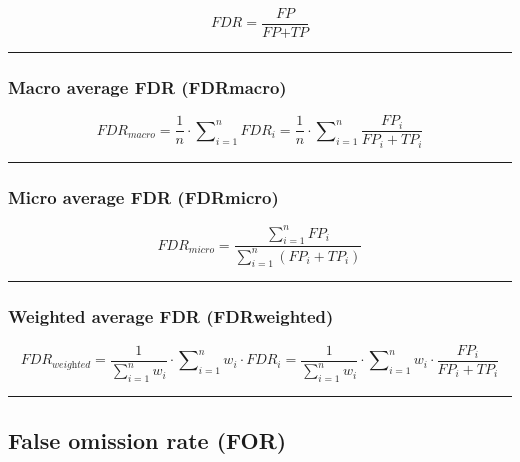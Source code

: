 \documentclass{article}
\begin{document}
\begin{equation}
	\textit{FDR} = \dfrac{\textit{FP}}{\textit{FP} + \textit{TP}}
%
	\label{equation:FDR}
\end{equation}

\hrule


\subsubsection{Macro average FDR (FDRmacro)}

\begin{equation}
	\textit{FDR}_\textit{macro} = \dfrac{1}{n} \cdot \sum\nolimits_{i = 1}^n \textit{FDR}_i = \dfrac{1}{n} \cdot \sum\nolimits_{i = 1}^n \dfrac{\textit{FP}_i}{\textit{FP}_i + \textit{TP}_i}
%
	\label{equation:MAAFDR}
\end{equation}

\hrule


\subsubsection{Micro average FDR (FDRmicro)}

\begin{equation}
	\textit{FDR}_\textit{micro} = \dfrac{\sum\nolimits_{i = 1}^n \textit{FP}_i}{\sum\nolimits_{i = 1}^n (\textit{FP}_i + \textit{TP}_i)}
%
	\label{equation:MIAFDR}
\end{equation}

\hrule


\subsubsection{Weighted average FDR (FDRweighted)}

\begin{equation}
	\textit{FDR}_\textit{weighted} = \dfrac{1}{\sum\nolimits_{i = 1}^n w_i} \cdot \sum\nolimits_{i = 1}^n w_i \cdot \textit{FDR}_i = \dfrac{1}{\sum\nolimits_{i = 1}^n w_i} \cdot \sum\nolimits_{i = 1}^n w_i \cdot \dfrac{\textit{FP}_i}{\textit{FP}_i + \textit{TP}_i}
%
	\label{equation:WAFDR}
\end{equation}

\hrule


\subsection[False omission rate (FOR)]{False omission rate (FOR) \cite{zafar2017fairness}}
\end{document}
